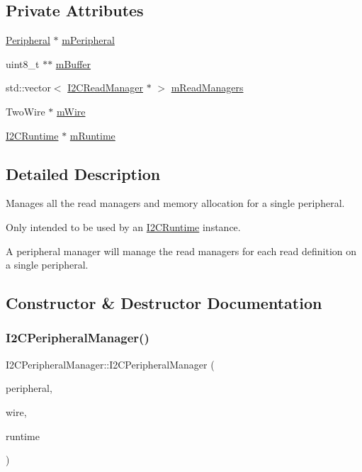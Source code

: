 \subsection*{Private Attributes}
\begin{DoxyCompactItemize}
\item 
\mbox{\hyperlink{struct_peripheral}{Peripheral}} $\ast$ \mbox{\hyperlink{class_i2_c_peripheral_manager_a758e4afa2027a73681b171219ba4cd50}{m\+Peripheral}}
\item 
uint8\+\_\+t $\ast$$\ast$ \mbox{\hyperlink{class_i2_c_peripheral_manager_a2460262d9bdd68a81f2dee42651a1ad8}{m\+Buffer}}
\item 
std\+::vector$<$ \mbox{\hyperlink{class_i2_c_read_manager}{I2\+C\+Read\+Manager}} $\ast$ $>$ \mbox{\hyperlink{class_i2_c_peripheral_manager_adf8ae8159cf193f1b004c6a2158ddf2d}{m\+Read\+Managers}}
\item 
Two\+Wire $\ast$ \mbox{\hyperlink{class_i2_c_peripheral_manager_a348d218edc48d69e21f8a0e204fde50a}{m\+Wire}}
\item 
\mbox{\hyperlink{class_i2_c_runtime}{I2\+C\+Runtime}} $\ast$ \mbox{\hyperlink{class_i2_c_peripheral_manager_a7dbb8937bebdd3e21d88728f02656422}{m\+Runtime}}
\end{DoxyCompactItemize}


\subsection{Detailed Description}
Manages all the read managers and memory allocation for a single peripheral. 

Only intended to be used by an \mbox{\hyperlink{class_i2_c_runtime}{I2\+C\+Runtime}} instance.

A peripheral manager will manage the read managers for each read definition on a single peripheral. 

\subsection{Constructor \& Destructor Documentation}
\mbox{\label{class_i2_c_peripheral_manager_a1e0399fb1723c895e13997275b686790}} 
\subsubsection{\texorpdfstring{I2\+C\+Peripheral\+Manager()}{I2CPeripheralManager()}}
{\footnotesize\ttfamily I2\+C\+Peripheral\+Manager\+::\+I2\+C\+Peripheral\+Manager (\begin{DoxyParamCaption}\item[{\mbox{\hyperlink{struct_peripheral}{Peripheral}} $\ast$}]{peripheral,  }\item[{Two\+Wire $\ast$}]{wire,  }\item[{\mbox{\hyperlink{class_i2_c_runtime}{I2\+C\+Runtime}} $\ast$}]{runtime }\end{DoxyParamCaption})}

